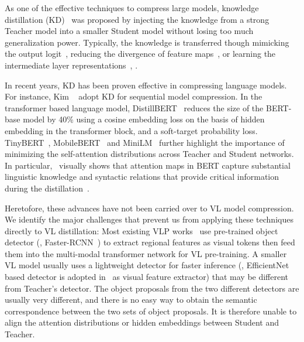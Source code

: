 As one of the effective techniques to compress large models, 
knowledge distillation (KD)~\cite{hinton2015distilling, bucilua2006model} was proposed  by injecting the knowledge from a strong Teacher model into a smaller Student model without losing too much generalization power. 
Typically, the knowledge is transferred though
mimicking the output logit~\cite{hinton2015distilling,sanh2019distilbert,fang2021seed}, reducing the divergence of feature maps~\cite{zagoruyko2016paying,NST2017,yim2017gift}, or learning the intermediate layer representations~\cite{koratana2019lit,ahn2019variational}, \etc. 

In recent years, KD has been proven effective in compressing language models. For instance, Kim \etal~\cite{kimrush2016sequence} adopt KD for sequential model compression. In the transformer based language model, DistillBERT~\cite{sanh2019distilbert} reduces the size of the BERT-base model by 40\% using a cosine embedding loss on the basis of hidden embedding in the transformer block, and a soft-target probability loss. TinyBERT~\cite{jiaoetal2020tinybert}, MobileBERT~\cite{sun2020mobilebert} and MiniLM~\cite{wang2020minilm} further highlight the importance of minimizing the self-attention distributions across Teacher and Student networks. In particular,~\cite{clark2019does} visually shows that attention maps in BERT capture substantial linguistic knowledge and syntactic relations that provide critical information during the distillation~\cite{jiaoetal2020tinybert}.

Heretofore, these advances have not been carried over to VL model compression.
We identify the major challenges that prevent us from applying these techniques directly to VL distillation:
Most existing VLP works~\cite{zhou2020unified,li2020oscar} use pre-trained object detector (\eg, Faster-RCNN~\cite{ren2015faster}) to extract regional features as visual tokens then feed them into the multi-modal transformer network for VL pre-training.
A smaller VL model usually uses a lightweight detector for faster inference (\eg, EfficientNet~\cite{tan2019efficientnet} based detector is adopted in~\cite{wang2020minivlm} as visual feature extractor) that may be different from Teacher's detector. The object proposals from the two different detectors are usually very different, and there is no easy way to obtain the semantic correspondence between the two sets of object proposals. It is therefore unable to align the attention distributions or hidden embeddings between Student and Teacher.

